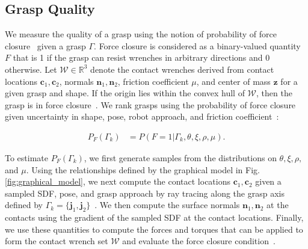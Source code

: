\documentclass[10pt, conference]{ieeeconf}      %
\newcommand{\bc}{\mathbf{c}}
\newcommand{\bj}{\mathbf{j}}
\newcommand{\bn}{\mathbf{n}}
\newcommand{\bz}{\mathbf{z}}
\newcommand{\mW}{\mathcal{W}}
\begin{document}
 
\subsection{Grasp Quality}\label{sec:grasp_sample}
We measure the quality of a grasp using the notion of probability of force closure~\cite{kehoe2012estimating, kehoe2012toward, kim2012physically,weisz2012pose} given a grasp $\Gamma$. Force closure is considered as a binary-valued quantity $F$ that is 1 if the grasp can resist wrenches in arbitrary directions and 0 otherwise.
Let $\mW \in \mathbb{R}^3$ denote the contact wrenches derived from contact locations $\bc_1,\bc_2$, normals $\bn_1,\bn_2$, friction coefficient $\mu$, and center of mass $\bz$ for a given grasp and shape.
If the origin lies within the convex hull of $\mW$, then the grasp is in force closure~\cite{li1988task}.
We rank grasps using the probability of force closure given uncertainty in shape, pose, robot approach, and friction coefficient~\cite{christopoulos2007handling, kehoe2012toward}:

\vspace{-2ex}
\begin{align*}
	P_F(\Gamma_k) &= P \left(F = 1 | \Gamma_k, \theta, \xi, \rho, \mu \right).
\end{align*}
 
To estimate $P_F(\Gamma_k)$, we first generate samples from the distributions on $\theta, \xi, \rho,$ and $\mu$.
Using the relationships defined by the graphical model in Fig. \ref{fig:graphical_model}, we next compute the contact locations $\bc_1, \bc_2$ given a sampled SDF, pose, and grasp approach by ray tracing along the grasp axis defined by $\Gamma_k = \lbrace \bj_1,\bj_2 \rbrace$~\cite{mahler2015gp}.
We then compute the surface normals $\bn_1, \bn_2$ at the contacts using the gradient of the sampled SDF at the contact locations.
Finally, we use these quantities to compute the forces and torques that can be applied to form the contact wrench set $\mW$ and evaluate the force closure condition~\cite{li1988task}.

%
%
% 
\end{document}
